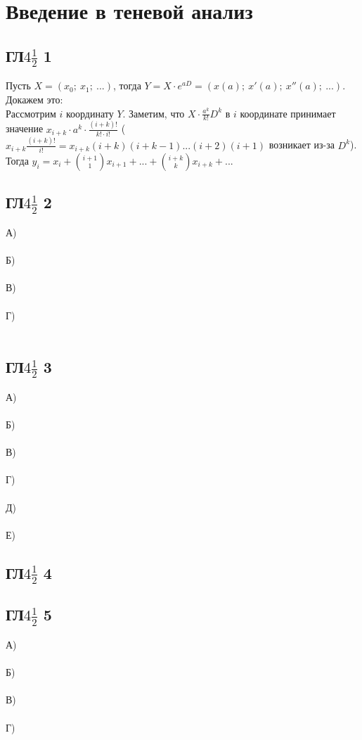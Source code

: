 \newpage		
	\section*{Введение в теневой анализ}
		
		\subsection{ГЛ$4\frac{1}{2}$ 1}
		Пусть $X = (x_0;\ x_1;\ ...)$, тогда $Y = X \cdot e^{aD} = (x(a);\ x'(a);\ x''(a);\ ...)$.\\
		Докажем это:\\
		Рассмотрим $i$ координату $Y$. Заметим, что $X \cdot \frac{a^k}{k!} D^k$ в $i$ координате принимает значение $x_{i+k} \cdot a^k \cdot \frac{(i+k)!}{k! \cdot i!}$ ($x_{i+k}\frac{(i+k)!}{i!} = x_{i+k}(i+k)(i+k-1)...(i+2)(i+1)$ возникает из-за $D^k$). Тогда $y_i = x_i + { i+1 \choose 1 } x_{i+1} + ... + { i+k \choose k } x_{i+k} + ... $
		
		\subsection{ГЛ$4\frac{1}{2}$ 2}
		А)\\
		\\
		Б)\\
		\\
		В)\\
		\\
		Г)\\
		\\
		\subsection{ГЛ$4\frac{1}{2}$ 3}
		А)\\
		\\
		Б)\\
		\\
		В)\\
		\\
		Г)\\
		\\
		Д)\\
		\\
		Е)\\
		
		\subsection{ГЛ$4\frac{1}{2}$ 4}
		
		\subsection{ГЛ$4\frac{1}{2}$ 5}
		А)\\
		\\
		Б)\\
		\\
		В)\\
		\\
		Г)\\
		
